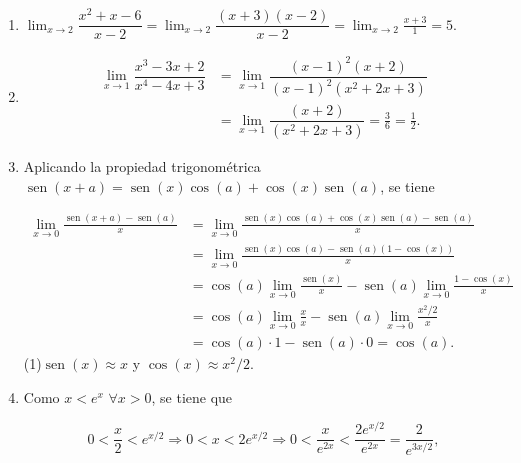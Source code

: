 \documentclass[
  spanish,
  a4paper,
]{scrreport}
\theoremstyle{definition}
\theoremstyle{remark}
\begin{document}
\begin{tcolorbox}[enhanced jigsaw, arc=.35mm, bottomrule=.15mm, bottomtitle=1mm, breakable, colback=white, colbacktitle=quarto-callout-tip-color!10!white, colframe=quarto-callout-tip-color-frame, coltitle=black, left=2mm, leftrule=.75mm, opacityback=0, opacitybacktitle=0.6, rightrule=.15mm, title=\textcolor{quarto-callout-tip-color}{\faLightbulb}\hspace{0.5em}{Solución}, titlerule=0mm, toprule=.15mm, toptitle=1mm]

\begin{enumerate}
\def\labelenumi{\alph{enumi}.}
\item
  \(\displaystyle \lim_{x\to 2} \dfrac{x^2+x-6}{x-2} =  \lim_{x\to 2} \dfrac{(x+3)(x-2)}{x-2} = \lim_{x\to 2} \frac{x+3}{1}=5\).
\item
  \begin{align*}
   \lim_{x\to 1}\dfrac{x^3-3x+2}{x^4-4x+3} &= \lim_{x\to 1}\dfrac{(x-1)^2(x+2)}{(x-1)^2(x^2+2x+3)}\\  
   &= \lim_{x\to 1}\dfrac{(x+2)}{(x^2+2x+3)}= \frac{3}{6}=\frac{1}{2}.
   \end{align*}
\item
  Aplicando la propiedad trigonométrica
  \(\operatorname{sen}(x+a)=\operatorname{sen}(x)\cos(a)+\cos(x)\operatorname{sen}(a)\),
  se tiene

  \begin{align*}
  \lim_{x\to 0}\frac{\operatorname{sen}(x+a)-\operatorname{sen}(a)}{x} &= \lim_{x\to 0}\frac{\operatorname{sen}(x)\cos(a)+\cos(x)\operatorname{sen}(a)-\operatorname{sen}(a)}{x} \\ 
  &= \lim_{x\to 0}\frac{\operatorname{sen}(x)\cos(a)-\operatorname{sen}(a)(1-\cos(x))}{x} \\ 
  &= \cos(a)\lim_{x\to 0}\frac{\operatorname{sen}(x)}{x}-\operatorname{sen}(a)\lim_{x\to 0}\frac{1-\cos(x)}{x}\\
  &= \cos(a)\lim_{x\to 0}\frac{x}{x}-\operatorname{sen}(a)\lim_{x\to 0}\frac{x^2/2}{x} \tag{1}\\
  & = \cos(a)\cdot 1-\operatorname{sen}(a)\cdot 0= \cos(a).
  \end{align*} (1)\(\operatorname{sen}(x)\approx x\) y
  \(\cos(x)\approx x^2/2\).
\item
  Como \(x<e^x\) \(\forall x>0\), se tiene que

  \[
  0<\frac{x}{2}<e^{x/2} \Rightarrow 0< x < 2e^{x/2} \Rightarrow  0< \frac{x}{e^{2x}} < \frac{2e^{x/2}}{e^{2x}} = \frac{2}{e^{3x/2}},\]


\end{enumerate}
\end{tcolorbox}
\end{document}
